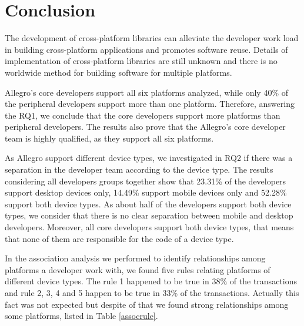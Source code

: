 \documentclass[10pt, conference]{IEEEtran}
\begin{document}
\section{Conclusion}
\label{conclusion}

The development of cross-platform libraries can alleviate the developer work load in building cross-platform applications and promotes software reuse. Details of implementation of cross-platform libraries are still unknown and there is no worldwide method for building software for multiple platforms. %

Allegro's core developers support all six platforms analyzed, while only 40\% of the peripheral developers support more than one platform. Therefore, answering the RQ1, we conclude that the core developers support more platforms than peripheral developers. The results also prove that the Allegro's core developer team is highly qualified, as they support all six platforms. 

As Allegro support different device types, we investigated in RQ2 if there was a separation in the developer team according to the device type. The results considering all developers groups together show that 23.31\% of the developers support desktop devices only, 14.49\% support mobile devices only and 52.28\% support both device types. As about half of the developers support both device types, we consider that there is no clear separation between mobile and desktop developers. Moreover, all core developers support both device types, that means that none of them are responsible for the code of a device type.  

In the association analysis we performed to identify relationships among platforms a developer work with, we found five rules relating platforms of different device types. The rule 1 happened to be true in 38\% of the transactions and rule 2, 3, 4 and 5 happen to be true in 33\% of the transactions.  Actually this fact was not expected but despite of that we found strong relationships among some platforms, listed in Table \ref{assocrule}. 
\end{document}
